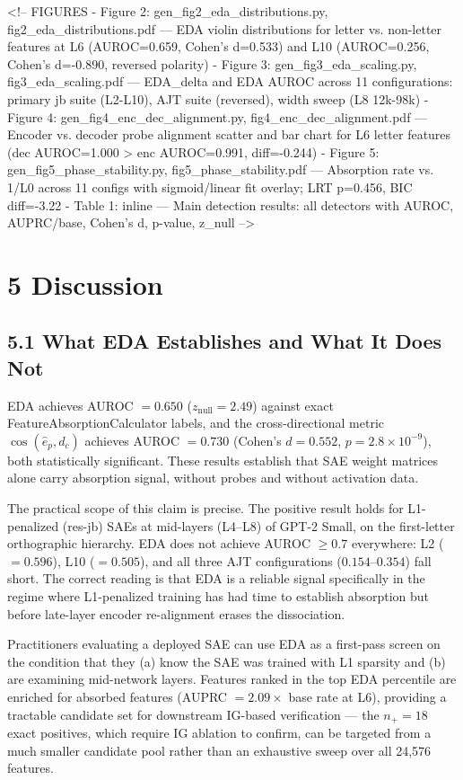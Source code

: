 \documentclass{article}
\begin{document}
<!-- FIGURES
- Figure 2: gen_fig2_eda_distributions.py, fig2_eda_distributions.pdf — EDA violin distributions for letter vs. non-letter features at L6 (AUROC=0.659, Cohen's d=0.533) and L10 (AUROC=0.256, Cohen's d=-0.890, reversed polarity)
- Figure 3: gen_fig3_eda_scaling.py, fig3_eda_scaling.pdf — EDA_delta and EDA AUROC across 11 configurations: primary jb suite (L2-L10), AJT suite (reversed), width sweep (L8 12k-98k)
- Figure 4: gen_fig4_enc_dec_alignment.py, fig4_enc_dec_alignment.pdf — Encoder vs. decoder probe alignment scatter and bar chart for L6 letter features (dec AUROC=1.000 > enc AUROC=0.991, diff=-0.244)
- Figure 5: gen_fig5_phase_stability.py, fig5_phase_stability.pdf — Absorption rate vs. 1/L0 across 11 configs with sigmoid/linear fit overlay; LRT p=0.456, BIC diff=-3.22
- Table 1: inline — Main detection results: all detectors with AUROC, AUPRC/base, Cohen's d, p-value, z_null
-->


\section{5 Discussion}

\subsection{5.1 What EDA Establishes and What It Does Not}

EDA achieves AUROC $= 0.650$ ($z_\text{null} = 2.49$) against exact FeatureAbsorptionCalculator
labels, and the cross-directional metric $\cos(\hat{e}_p, d_c)$ achieves AUROC $= 0.730$
(Cohen's $d = 0.552$, $p = 2.8 \times 10^{-9}$), both statistically significant.
These results establish that SAE weight matrices alone carry absorption signal, without probes
and without activation data.

The practical scope of this claim is precise. The positive result holds for L1-penalized
(res-jb) SAEs at mid-layers (L4–L8) of GPT-2 Small, on the first-letter orthographic hierarchy.
EDA does not achieve AUROC $\geq 0.7$ everywhere: L2 ($= 0.596$), L10 ($= 0.505$), and all
three AJT configurations ($0.154$–$0.354$) fall short. The correct reading is that EDA is
a reliable signal specifically in the regime where L1-penalized training has had time to
establish absorption but before late-layer encoder re-alignment erases the dissociation.

Practitioners evaluating a deployed SAE can use EDA as a first-pass screen on the condition
that they (a) know the SAE was trained with L1 sparsity and (b) are examining mid-network
layers. Features ranked in the top EDA percentile are enriched for absorbed features
(AUPRC $= 2.09\times$ base rate at L6), providing a tractable candidate set for downstream
IG-based verification — the $n_+ = 18$ exact positives, which require IG ablation to confirm,
can be targeted from a much smaller candidate pool rather than an exhaustive sweep over all
24,576 features.
\end{document}
